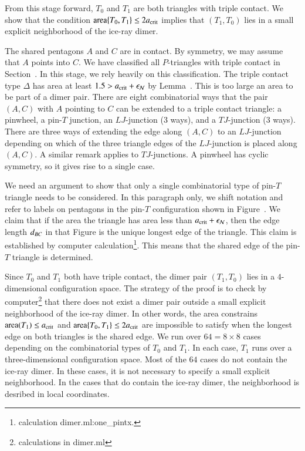 From this stage forward, $T_0$ and $T_1$ are both triangles with
triple contact.  We show that the condition ${\operatorname{area}}\{T_0,T_1\}\le
2a_\text{crit}$ implies that $(T_1,T_0)$ lies in a small explicit
neighborhood of the ice-ray dimer.

The shared pentagons $A$ and $C$ are in contact.  By symmetry, we may
assume that $A$ points into $C$.  We have classified all $P$-triangles
with triple contact in Section~.  In this stage, we
rely heavily on this classification.  The triple contact type $\Delta$
has area at least $1.5 > a_\text{crit}+\epsilon_{\mathcal N}$ by Lemma~.
This is too large an area to be part of a dimer pair.  There are eight
combinatorial ways that the pair $(A,C)$ with $A$ pointing to $C$ can
be extended to a triple contact triangle: a pinwheel, a pin-$T$
junction, an $LJ$-junction (3 ways), and a $TJ$-junction (3 ways).
There are three ways of extending the edge along $(A,C)$ to an
$LJ$-junction depending on which of the three triangle edges of the
$LJ$-junction is placed along $(A,C)$.  A similar remark applies to
$TJ$-junctions.  A pinwheel has cyclic symmetry, so it gives rise to a
single case.

We need an argument to show that only a single combinatorial type of
pin-$T$ triangle needs to be considered.  In this paragraph only, we
shift notation and refer to labels on pentagons in the pin-$T$
configuration shown in Figure~.  We claim that if
the area the triangle has area less than $a_\text{crit}+\epsilon_{\mathcal N}$, then the edge
length $d_{BC}$ in that Figure is the unique longest edge of the
triangle.  This claim is established by computer
calculation\footnote{calculation dimer.ml:one\_pintx.}.  This means
that the shared edge of the pin-$T$ triangle is determined.

Since $T_0$ and $T_1$ both have triple contact, the dimer pair
$(T_1,T_0)$ lies in a $4$-dimensional configuration space.  The
strategy of the proof is to check by computer\footnote{calculations in
  dimer.ml} that there does not exist a dimer pair outside a small
explicit neighborhood of the ice-ray dimer.  In other words, the area
constrains ${\operatorname{area}}(T_1)\le a_\text{crit}$ and ${\operatorname{area}}\{T_0,T_1\}\le2a_\text{crit}$ are
impossible to satisfy when the longest edge on both triangles is the
shared edge.  We run over $64 = 8\times 8$ cases depending on the
combinatorial types of $T_0$ and $T_1$.  In each case, $T_1$ runs over
a three-dimensional configuration space.  Most of the $64$ cases do
not contain the ice-ray dimer.  In these cases, it is not necessary to
specify a small explicit neighborhood.  In the cases that do contain
the ice-ray dimer, the neighborhood is desribed in local coordinates.

